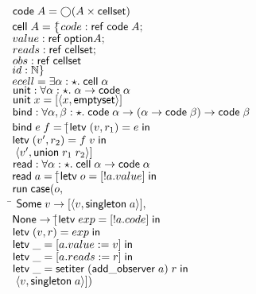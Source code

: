 \begin{figure}
\begin{tabbing}
$\mathsf{code}\;{A} = \bigcirc{(A \times \mathsf{cellset})}$ \\[1em]
$\mathsf{cell}\;{A} = \{$\=$code: \mathsf{ref}\;\mathsf{code}\;{A};$ \\
                   \>$value: \mathsf{ref}\;\mathsf{option }{A};$ \\
                   \>$reads: \mathsf{ref}\;\mathsf{cellset};$ \\
                   \>$obs:   \mathsf{ref}\;\mathsf{cellset}\;$ \\
                   \>$id:    \mathbb{N}\}$ \\[1em]

$ecell = \exists \alpha:\star.\; \mathsf{cell}\;{\alpha}$ \\[1em]

$\mathsf{unit} : \forall \alpha:\star.\; \alpha \to \mathsf{code}\;{\alpha}$ \\
$\mathsf{unit}\;x = [\left<{x},{\mathsf{emptyset}}\right>]$ \\[1em]

$\mathsf{bind} : \forall \alpha,\beta:\star.\; \mathsf{code}\;{\alpha} \to (\alpha \to \mathsf{code}\;{\beta}) \to \mathsf{code}\;{\beta}$ \\
$\mathsf{bind}\;e\;f = [$\=$\mathsf{letv}\;(v,r_1) = e\;\mathsf{in}\;$ \\
                        \>$\mathsf{letv}\;(v',r_2) = f\;v\;\mathsf{in}\;$ \\
                        \>$\;\left<{v'},{\mathsf{union}\;r_1\;r_2}\right>]$\\[1em]

$\mathsf{read} : \forall \alpha:\star.\; \mathsf{cell}\;{\alpha} \to \mathsf{code}\;{\alpha}$ \\
$\mathsf{read}\;a = [$\=$\mathsf{letv}\;o = [!a.value]\;\mathsf{in}\;$ \\
                     \>$\mathsf{run}\;\mathsf{case}(o,$ \\
                     \>\qquad\= $\mathsf{Some}\;v \to [\left<{v},{\mathsf{singleton}\;a}\right>],$ \\
                     \>      \> $\mathsf{None} \to [$\=$\mathsf{letv}\;exp = [!a.code]\;\mathsf{in}\;$ \\
                     \>      \>                     \>$\mathsf{letv}\;(v,r) = exp\;\mathsf{in}\;$ \\
                     \>      \>                     \>$\mathsf{letv}\;\_ = [a.value := v]\;\mathsf{in}\;$\\
                     \>      \>                     \>$\mathsf{letv}\;\_ = [a.reads := r]\;\mathsf{in}\;$ \\
                     \>      \>                     \>$\mathsf{letv}\;\_ = \mathsf{setiter}\;(\mathsf{add\_observer}\;a)\;r\;\mathsf{in}\;$ \\
                     \>      \>                     \>$\;\left<{v},{\mathsf{singleton}\;a}\right>])$ \\[1em]


\end{tabbing}
\end{figure}

